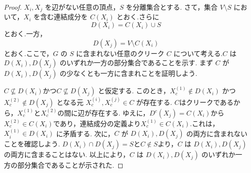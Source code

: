 \documentclass[uplatex, dvipdfmx]{jsarticle}
\begin{document}
\begin{proof}
  $X_i, X_j$ を辺がない任意の頂点，$S$ を分離集合とする.
  さて，集合 $V \setminus S$ において，$X_i$ を含む連結成分を $C(X_i)$ とおく.さらに
  \begin{equation*}
      D(X_i) = C(X_i) \cup S
  \end{equation*}
  とおく.一方，
  \begin{equation*}
      D(X_j) = V \setminus C(X_i)
  \end{equation*}
  とおく.ここで，$G$ の $S$ に含まれない任意のクリーク $C$ について考える.$C$ は $D(X_i), D(X_j)$ のいずれか一方の部分集合であることを示す.
  まず $C$ が $D(X_i), D(X_j)$ の少なくとも一方に含まれことを証明しよう.

  $C \not\subseteq D(X_i)$かつ$C \not\subseteq D(X_j)$ と仮定する.
  このとき，$X_c^{(1)} \notin D(X_i)$ かつ $X_c^{(2)} \notin D(X_j)$ となる元 $X_c^{(i)}, X_c^{(j)} \in C$ が存在する.
  $C$はクリークであるから，$X_c^{(1)}$と$X_c^{(2)}$の間に辺が存在する.
  ゆえに，$D^{c}(X_j)=C(X_i)$から$X_c^{(2)} \in C(X_i)$であり，連結成分の定義より$X_c^{(1)} \in C(X_i)$.これは，$X_i^{(1)} \in D(X_i)$ に矛盾する.
  次に，$C$ が $D(X_i), D(X_j)$ の両方に含まれないことを確認しよう.
  $D(X_i) \cap D(X_j) = S$と$C \notin S$より，$C$ は $D(X_i), D(X_j)$ の両方に含まることはない.
  以上により，$C$ は $D(X_i), D(X_j)$ のいずれか一方の部分集合であることが示された.
  

\end{proof}
\end{document}
